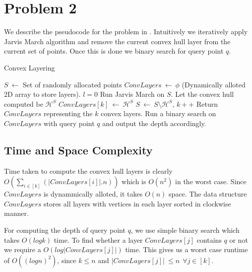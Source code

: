 \section{Problem 2}

We describe the pseudocode for the problem in . Intuitively we iteratively apply Jarvis March algorithm and remove the current convex hull layer from the current set of points. Once this is done we binary search for query point $q$.

\begin{algorithm}
\caption{Convex Layering \label{alg:iterjarvis}}
\begin{algorithmic}[1]
\STATE $S\ \leftarrow$ Set of randomly allocated points
\STATE $ConvLayers\ \leftarrow\ \phi$ (Dynamically alloted 2D array to store layers).
\STATE $l = 0$
	\STATE Run Jarvis March on $S$. Let the convex hull computed be $\mathcal H^S$
	\STATE $ConvLayers[k]\ \leftarrow\ \mathcal H^S$ 
	\STATE $S\ \leftarrow\ S\setminus \mathcal H^S$, $k++$
\ENDWHILE
\STATE Return $ConvLayers$ representing the $k$ convex layers.
\STATE Run a binary search on $ConvLayers$ with query point $q$ and output the depth accordingly.
\end {algorithmic}
\end{algorithm}


\subsection{Time and Space Complexity}
Time taken to compute the convex hull layers is clearly $O(\sum_{i\in [k]}(|ConvLayers[i]|.n))$ which is $O(n^2)$ in the worst case. Since $ConvLayers$ is dynammically alloted, it takes $O(n)$ space.
The data structure $ConvLayers$ stores all layers with vertices in each layer sorted in clockwise manner.


For computing the depth of query point $q$, we use simple binary search which takes $O(logk)$ time. To find whether a layer $ConvLayers[j]$ contains $q$ or not we require a $O(log|ConvLayers[j]|)$ time. This gives us a worst case runtime of $O((logn)^2)$, since $k\leq n$ and $|ConvLayers[j]| \ \leq n \ \ \forall j\in [k]$.


